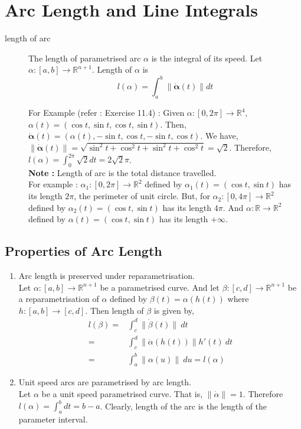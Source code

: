 \section{Arc Length and Line Integrals}
\begin{description}
	\item[length of arc] The length of parametrised arc $\alpha$ is the integral of its speed.
		Let $\alpha : [a,b] \to \mathbb{R}^{n+1}$.
		Length of $\alpha$ is
	\begin{equation}
		l(\alpha) = \int_a^b \| \dot{\boldsymbol{\alpha}}(t) \| dt
	\end{equation}

	For Example (refer : Exercise 11.4) : Given $\alpha: [0,2\pi] \to \mathbb{R}^4$, $\alpha(t) = (\cos t,\sin t, \cos t,\sin t)$.
		Then, $\dot{\boldsymbol{\alpha}}(t) = (\alpha(t),-\sin t,\cos t,-\sin t,\cos t)$.
		We have, $\| \dot{\boldsymbol{\alpha}}(t) \| = \sqrt{\sin^2 t+\cos^2 t+\sin^2 t+ \cos^2 t} = \sqrt{2}$.
		Therefore, $l(\alpha) = \int_0^{2\pi} \sqrt{2}dt = 2\sqrt{2}\pi$.\\



	\textbf{Note :} 
		Length of arc is the total distance travelled.\\
	For example : $\alpha_1 : [0,2\pi] \to \mathbb{R}^2$ defined by $\alpha_1(t) = (\cos t,\sin t)$ has its length $2\pi$, the perimeter of unit circle.
		But, for $\alpha_2 : [0,4\pi] \to \mathbb{R}^2$ defined by $\alpha_2(t) = (\cos t,\sin t)$ has its length $4\pi$.
		And $\alpha : \mathbb{R} \to \mathbb{R}^2$ defined by $\alpha(t) = (\cos t,\sin t)$ has its length $+\infty$.
\end{description}

\subsection{Properties of Arc Length}
\begin{enumerate}
	\item Arc length is preserved under reparametrisation.\\
		Let $\alpha : [a,b] \to \mathbb{R}^{n+1}$ be a parametrised curve.
		And let $\beta : [c,d] \to \mathbb{R}^{n+1}$ be a reparametrisation of $\alpha$ defined by $\beta(t) = \alpha(h(t))$ where $h : [a,b] \to [c,d]$.
		Then length of $\beta$ is given by,
	\begin{align*}
		l(\beta) = & \int_c^d \| \dot{\beta}(t)\|\ dt \\
		= & \int_c^d \|\dot{\alpha}(h(t))\|h'(t)\ dt\\
		= & \int_a^b \|\alpha(u)\|\ du = l(\alpha)
	\end{align*}
	\item Unit speed arcs are parametrised by arc length.\\
		Let $\alpha$ be a unit speed parametrised curve.
		That is, $\|\dot{\alpha}\| = 1$.
		Therefore $l(\alpha) = \int_a^b dt = b-a$.
		Clearly, length of the arc is the length of the parameter interval.
\end{enumerate}

